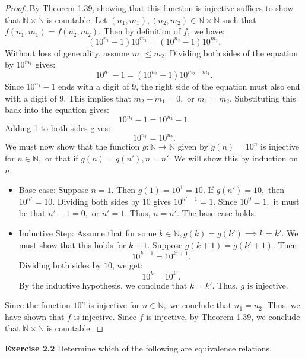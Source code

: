 \documentclass[11pt]{article}
\begin{document}
\begin{proof}
    By Theorem 1.39, showing that this function is injective suffices to show that $\mathbb{N} \times \mathbb{N}$ is countable.
    Let $(n_1,m_1), (n_2,m_2) \in \mathbb{N} \times \mathbb{N}$ such that $f(n_1,m_1) = f(n_2,m_2).$ Then by definition of $f,$ we have:
    \[
    (10^{n_1} - 1)10^{m_1} = (10^{n_2} - 1)10^{m_2}.
    \]
    Without loss of generality, assume $m_1 \leq m_2.$ Dividing both sides of the equation by $10^{m_1}$ gives:
    \[10^{n_1} - 1 = (10^{n_2} - 1)10^{m_2 - m_1}.\]
    Since $10^{n_1} - 1$ ends with a digit of 9, the right side of the equation must also end with a digit of 9. This implies that $m_2 - m_1 = 0,$ or $m_1 = m_2.$ Substituting this back into the equation gives:
    \[10^{n_1} - 1 = 10^{n_2} - 1.\]
    Adding 1 to both sides gives:
    \[10^{n_1} = 10^{n_2}.\]
    We must now show that the function $g: \mathbb{N} \rightarrow \mathbb{N}$ given by $g(n) = 10^n$ is injective for $n \in \mathbb{N},$ or that if $g(n) = g(n'), n = n'$. We will show this by induction on $n.$
    \begin{itemize}
        \item Base case: Suppose $n = 1.$ Then $g(1) = 10^1 = 10$. If $g(n') = 10,$ then $10^{n'} = 10.$ Dividing both sides by 10 gives $10^{n' - 1} = 1.$ Since $10^0 = 1,$ it must be that $n' - 1 = 0,$ or $n' = 1.$ Thus, $n = n'.$ The base case holds.
        \item Inductive Step: Assume that for some $k \in \mathbb{N}, g(k) = g(k') \implies k = k'$. We must show that this holds for $k + 1$. Suppose $g(k + 1) = g(k' + 1)$. Then:
        \[
        10^{k + 1} = 10^{k' + 1}.
        \]
        Dividing both sides by $10$, we get:
        \[
        10^k = 10^{k'}.
        \]
        By the inductive hypothesis, we conclude that $k = k'$. Thus, $g$ is injective.
    \end{itemize}
    Since the function $10^n$ is injective for $n \in \mathbb{N},$ we conclude that $n_1 = n_2.$ Thus, we have shown that $f$ is injective. Since $f$ is injective, by Theorem 1.39, we conclude that $\mathbb{N} \times \mathbb{N}$ is countable.

\end{proof}
\noindent\textbf{Exercise 2.2} Determine which of the following are equivalence relations.
\end{document}
